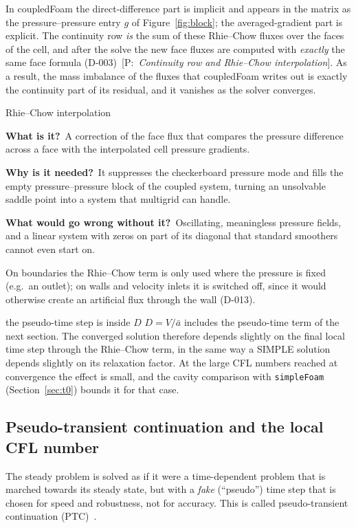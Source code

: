\documentclass[11pt,a4paper]{article}
\newcommand{\code}[1]{\texttt{#1}}
\newcommand{\bbwhat}{\par\smallskip\noindent\textbf{What is it?}\ }
\newcommand{\bbwhy}{\par\smallskip\noindent\textbf{Why is it needed?}\ }
\newcommand{\bbwithout}{\par\smallskip\noindent\textbf{What would go wrong
  without it?}\ }
\newcommand{\pro}[1]{\ {\small[P:~\textit{#1}]}}
\begin{document}
In coupledFoam the direct-difference part is implicit and appears in the
matrix as the pressure--pressure entry $g$ of Figure~\ref{fig:block}; the
averaged-gradient part is explicit. The continuity row \emph{is} the sum of
these Rhie--Chow fluxes over the faces of the cell, and after the solve the
new face fluxes are computed with \emph{exactly} the same face formula
(D-003)\pro{Continuity row and Rhie--Chow interpolation}. As a result, the mass imbalance of the fluxes that
coupledFoam writes out is exactly the continuity part of its residual, and
it vanishes as the solver converges.

\begin{bblock}{Rhie--Chow interpolation}
\bbwhat A correction of the face flux that compares the pressure difference
across a face with the interpolated cell pressure gradients.
\bbwhy It suppresses the checkerboard pressure mode and fills the empty
pressure--pressure block of the coupled system, turning an unsolvable
saddle point into a system that multigrid can handle.
\bbwithout Oscillating, meaningless pressure fields, and a linear system
with zeros on part of its diagonal that standard smoothers cannot even
start on.
\end{bblock}

On boundaries the Rhie--Chow term is only used where the pressure is fixed
(e.g.\ an outlet); on walls and velocity inlets it is switched off, since
it would otherwise create an artificial flux through the wall (D-013).

\begin{pitfall}{the pseudo-time step is inside $D$}
  $D=V/\bar a$ includes the pseudo-time term of the next section. The
  converged solution therefore depends slightly on the final local time
  step through the Rhie--Chow term, in the same way a SIMPLE solution
  depends slightly on its relaxation factor. At the large CFL numbers
  reached at convergence the effect is small, and the cavity comparison
  with \code{simpleFoam} (Section~\ref{sec:t0}) bounds it for that case.
\end{pitfall}

\subsection{Pseudo-transient continuation and the local CFL number}\label{sec:ptc}

The steady problem is solved as if it were a time-dependent problem that
is marched towards its steady state, but with a \emph{fake} (``pseudo'')
time step that is chosen for speed and robustness, not for accuracy. This
is called pseudo-transient continuation (PTC)~\cite{Kelley1998}.
\end{document}

